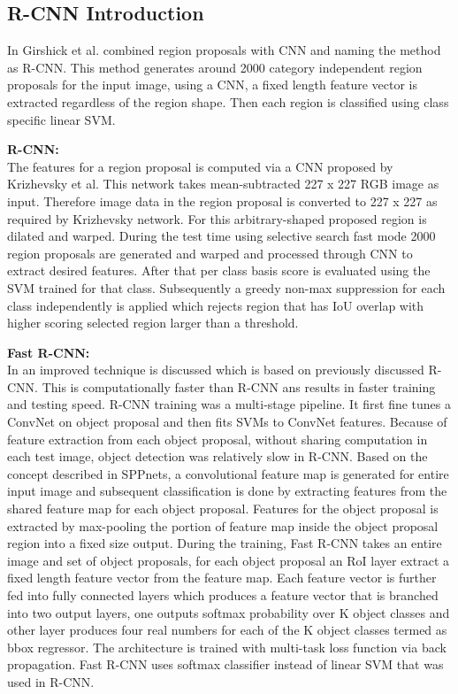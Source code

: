 \subsection{R-CNN Introduction}
In \cite{girshick2014rich} Girshick et al. combined region proposals with CNN and naming the method as R-CNN. This method generates around 2000 category independent region proposals for the input image, using a CNN, a fixed length feature vector is extracted regardless of the region shape. Then each region is classified using class specific linear SVM. 

\newpara \textbf{R-CNN:} \\
The features for a region proposal is computed via a CNN proposed by Krizhevsky et al. This network takes mean-subtracted 227 x 227 RGB image as input. Therefore image data in the region proposal is converted to 227 x 227 as required by Krizhevsky network. For this arbitrary-shaped  proposed region is dilated and warped. During the test time using selective search fast mode 2000 region proposals are generated and warped and processed through CNN to extract desired features. After that per class basis score is evaluated using the SVM trained for that class. Subsequently a greedy non-max suppression for each class independently is applied which rejects region that has IoU overlap with higher scoring selected region larger than a threshold.

\newpara \textbf{Fast R-CNN:} \\
In \cite{girshick2015fast} an improved technique is discussed which is based on previously discussed R-CNN. This is computationally faster than R-CNN ans results in faster training and testing speed. R-CNN training was a multi-stage pipeline. It first fine tunes a ConvNet on object proposal and then fits SVMs to ConvNet features. Because of feature extraction from each object proposal, without sharing computation in each test image, object detection was relatively slow in R-CNN. Based on the concept described in SPPnets, a convolutional feature map is generated for entire input image and subsequent classification is done by extracting features from the shared feature map for each object proposal. Features for the object proposal is extracted by max-pooling the portion of feature map inside the  object proposal region into a fixed size output. During the training, Fast R-CNN takes an entire image and set of object proposals, for each object proposal an RoI layer extract a fixed length feature vector from the feature map. Each feature vector is further fed into fully connected layers which produces a feature vector that is branched into two output layers, one outputs softmax probability over K object classes and other layer produces four real numbers for each of the K object classes termed as bbox regressor. The architecture is trained with multi-task loss function via back propagation. Fast R-CNN uses softmax classifier instead of linear SVM that was used in R-CNN.

